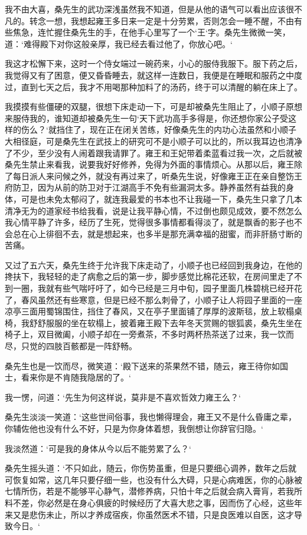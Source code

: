 我不由大喜，桑先生的武功深浅虽然我不知道，但是从他的语气可以看出应该很不凡的。转念一想，我想起雍王多日来一定是十分劳累，否则怎会一睡不醒，不由有些焦急，连忙握住桑先生的手，在他手心里写了一个‘王‘字。桑先生微微一笑，道：‘难得殿下对你这般亲厚，我已经去看过他了，你放心吧。‘

我这才松懈下来，这时一个侍女端过一碗药来，小心的服侍我服下。服下药之后，我觉得又有了困意，便又昏昏睡去，就这样一连数日，我便是在睡眠和服药之中度过，直到七天之后，我才不用喝那种加料了的汤药，终于可以清醒的躺在床上了。

我摸摸有些僵硬的双腿，很想下床走动一下，可是却被桑先生阻止了，小顺子原想来服侍我的，谁知道却被桑先生一句‘天下武功高手多得是，你还想你家公子受这样的伤么？‘就挡住了，现在正在闭关苦练，好像桑先生的内功心法虽然和小顺子大相径庭，可是桑先生在武技上的研究可不是小顺子可以比的，所以我耳边也清净了不少，至少没有人闹着跟我请罪了。雍王和王妃带着柔蓝看过我一次，之后就被桑先生禁止来看我，说要我好好修养，免得为外面的事情烦心。从那以后，雍王除了每日派人来问候之外，就没有再过来了，听桑先生说，好像雍王正在亲自整饬王府防卫，因为从前的防卫对于江湖高手不免有些漏洞太多。静养虽然有益我的身体，可是也未免太郁闷了，就连我最爱的书本也不让我碰一下，桑先生只拿了几本清净无为的道家经书给我看，说是让我平静心情，不过倒也颇见成效，要不然怎么我心情平静了许多，经历了生死，觉得很多事情都看得淡了，就是飘香的影子也不会总在心上徘徊不去，就是想起来，也多半是那充满幸福的甜蜜，而非肝肠寸断的苦痛。

又过了五六天，桑先生终于允许我下床走动了，小顺子也已经回到我身边，在他的搀扶下，我轻轻的走了病愈之后的第一步，脚步感觉比棉花还软，在房间里走了不到一圈，我就有些气喘吁吁了，如今已经是三月中旬，园子里面几株碧桃已经开花了，春风虽然还有些寒意，但是已经不那么刺骨了，小顺子让人将园子里面的一座凉亭三面用蜀锦围住，挡住了春风，又在亭子里面铺了厚厚的波斯毯，放上软榻桌椅，我舒舒服服的坐在软榻上，披着雍王殿下去年冬天赏赐的银狐裘，桑先生坐在椅子上，双目微阖，小顺子却在一旁煮茶，不多时两杯热茶送了过来，我一饮而尽，只觉的四肢百骸都是一阵舒畅。

桑先生也是一饮而尽，微笑道：‘殿下送来的茶果然不错，随云，雍王待你如国士，看来你是不肯随我隐居的了。‘

我一愣，问道：‘先生为何这样说，莫非是不喜欢哲效力雍王么？‘

桑先生淡淡一笑道：‘这些世间俗事，我也懒得理会，雍王又不是什么昏庸之辈，你辅佐他也没有什么不好，只是为你身体着想，我倒想让你辞官归隐。‘

我淡然道：‘可是我的身体从今以后不能劳累了么？‘

桑先生摇头道：‘不只如此，随云，你伤势虽重，但是只要细心调养，数年之后就可恢复如常，这几年只要仔细一些，也没有什么大碍，只是心病难医，你的心脉被七情所伤，若是不能够平心静气，潜修养病，只怕十年之后就会病入膏肓，若我所料不差，你必然是在身心俱疲的时候经历了大喜大悲之事，因而伤了心经，这些年来又是悲伤未止，所以才养成宿疾，你虽然医术不错，只是良医难以自医，这才导致今日。‘

